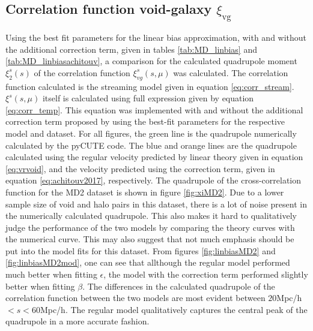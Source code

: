 \subsection{Correlation function void-galaxy $\xi_{\mathrm{vg}}$}
Using the best fit parameters for the linear bias approximation, with and without the additional correction term, given in tables \ref{tab:MD_linbias} and \ref{tab:MD_linbiasachitouv}, a comparison for the calculated quadrupole moment $\xi_2^s(s)$ of the correlation function $\xi_{vg}^s(s,\mu)$ was calculated. The correlation function calculated is the streaming model given in equation \ref{eq:corr_stream}. $\xi^s(s,\mu)$ itself is calculated using full expression given by equation \ref{eq:corr_temp}. This equation was implemented with and without the additional correction term proposed by \cite{Achitouv_streaming} using the best-fit parameters for the respective model and dataset. For all figures, the green line is the quadrupole numerically calculated by the pyCUTE code. The blue and orange lines are the quadrupole calculated using the regular velocity predicted by linear theory given in equation \ref{eq:vrvoid}, and the velocity predicted using the correction term, given in equation \ref{eq:achitouv2017}, respectively. The quadrupole of the cross-correlation function for the MD2 dataset is shown in figure \ref{fig:xiMD2}. Due to a lower sample size of void and halo pairs in this dataset, there is a lot of noise present in the numerically calculated quadrupole. This also makes it hard to qualitatively judge the performance of the two models by comparing the theory curves with the numerical curve. This may also suggest that not much emphasis should be put into the model fits for this dataset. From figures \ref{fig:linbiasMD2} and \ref{fig:linbiasMD2mod}, one can see that allthough the regular model performed much better when fitting $\epsilon$, the model with the correction term performed slightly better when fitting $\beta$. The differences in the calculated quadrupole of the correlation function between the two models are most evident between $20$Mpc/h$<s<60$Mpc/h. The regular model qualitatively captures the central peak of the quadrupole in a more accurate fashion.\\\indent

